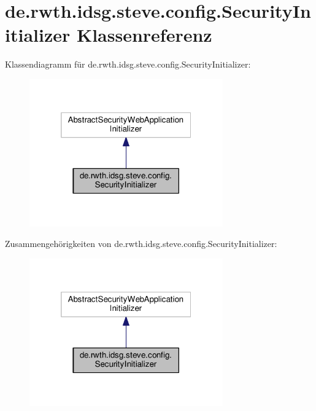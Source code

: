 \hypertarget{classde_1_1rwth_1_1idsg_1_1steve_1_1config_1_1_security_initializer}{\section{de.\-rwth.\-idsg.\-steve.\-config.\-Security\-Initializer Klassenreferenz}
\label{classde_1_1rwth_1_1idsg_1_1steve_1_1config_1_1_security_initializer}
}


Klassendiagramm für de.\-rwth.\-idsg.\-steve.\-config.\-Security\-Initializer\-:\nopagebreak
\begin{figure}[H]
\begin{center}
\leavevmode
\includegraphics[width=236pt]{classde_1_1rwth_1_1idsg_1_1steve_1_1config_1_1_security_initializer__inherit__graph}
\end{center}
\end{figure}


Zusammengehörigkeiten von de.\-rwth.\-idsg.\-steve.\-config.\-Security\-Initializer\-:\nopagebreak
\begin{figure}[H]
\begin{center}
\leavevmode
\includegraphics[width=236pt]{classde_1_1rwth_1_1idsg_1_1steve_1_1config_1_1_security_initializer__coll__graph}
\end{center}
\end{figure}


